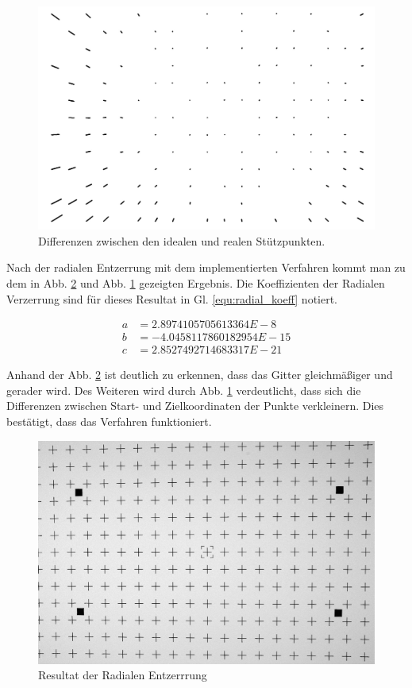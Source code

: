 \begin{figure}[H]
	\includegraphics[width=\textwidth]{Images/Auswertung/Testbild1/SourceImage with PointPairs_onlydiffs.jpg}
	\caption{Differenzen zwischen den idealen und realen Stützpunkten.}
	\label{fig:diffsResult}
\end{figure}

Nach der radialen Entzerrung mit dem implementierten Verfahren kommt man zu dem in Abb. \ref{fig:Ergebnis} und Abb. \ref{fig:diffsResult} gezeigten Ergebnis. Die Koeffizienten der Radialen Verzerrung sind für dieses Resultat in Gl. \ref{equ:radial_koeff} notiert. 

\begin{align}
a &=  2.8974105705613364E-8 \nonumber \\
b &= -4.0458117860182954E-15 \nonumber \\
c &=  2.8527492714683317E-21
\label{equ:radial_koeff}
\end{align}

Anhand der Abb. \ref{fig:Ergebnis} ist deutlich zu erkennen, dass das Gitter gleichmäßiger und gerader wird. Des Weiteren wird durch Abb. \ref{fig:diffsResult} verdeutlicht, dass sich die Differenzen zwischen Start- und Zielkoordinaten der Punkte verkleinern. Dies bestätigt, dass das Verfahren funktioniert.

\begin{figure}[H]
	\includegraphics[width=\textwidth]{Images/Auswertung/Testbild1/Radial.jpg}
	\caption{Resultat der Radialen Entzerrrung}
	\label{fig:Ergebnis}
\end{figure}

